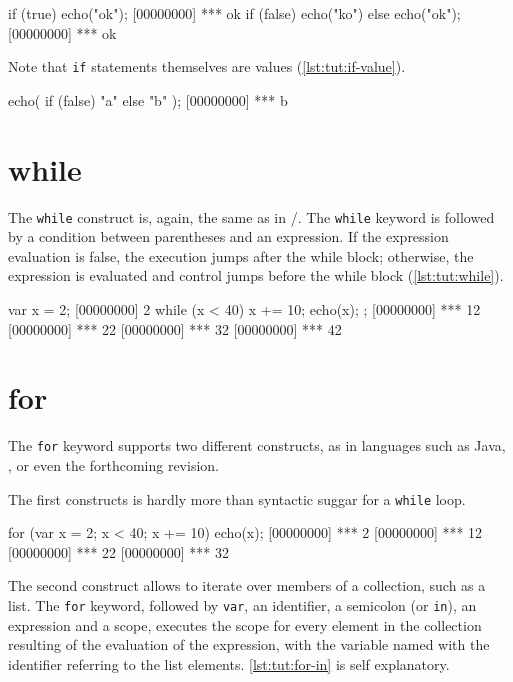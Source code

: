 \begin{urbiscript}[caption=The \lstinline{if} construct, label=lst:tut:if]
if (true)
  echo("ok");
[00000000] *** ok
if (false)
  echo("ko")
else
  echo("ok");
[00000000] *** ok
\end{urbiscript}

Note that \lstinline|if| statements themselves are values
(\autoref{lst:tut:if-value}).

\begin{urbiscript}[caption=\lstinline{if} are values, label=lst:tut:if-value]
echo({ if (false) "a" else "b" });
[00000000] *** b
\end{urbiscript}

\section{while}

The \lstinline{while} construct is, again, the same as in \C/\Cxx. The
\lstinline{while} keyword is followed by a condition between parentheses
and an expression. If the expression evaluation is false, the
execution jumps after the while block; otherwise, the expression is
evaluated and control jumps before the while block (\autoref{lst:tut:while}).

\begin{urbiscript}[caption=The \lstinline{while} construct,
label=lst:tut:while]
var x = 2;
[00000000] 2
while (x < 40)
{
  x += 10;
  echo(x);
};
[00000000] *** 12
[00000000] *** 22
[00000000] *** 32
[00000000] *** 42
\end{urbiscript}

\section{for}

The \lstinline{for} keyword supports two different constructs, as in
languages such as Java, \Cs, or even the forthcoming \Cxx revision.

The first constructs is hardly more than syntactic suggar for a
\lstinline{while} loop.

\begin{urbiscript}[caption=Iterations with increments, label=lst:tut:for]
for (var x = 2; x < 40; x += 10)
  echo(x);
[00000000] *** 2
[00000000] *** 12
[00000000] *** 22
[00000000] *** 32
\end{urbiscript}

The second construct allows to iterate over members of a collection,
such as a list. The \lstinline{for} keyword, followed by
\lstinline|var|, an identifier, a semicolon (or \lstinline|in|), an
expression and a
scope, executes the scope for every element in the collection
resulting of the evaluation of the expression, with the variable named
with the identifier referring to the list
elements. \autoref{lst:tut:for-in} is self explanatory.


